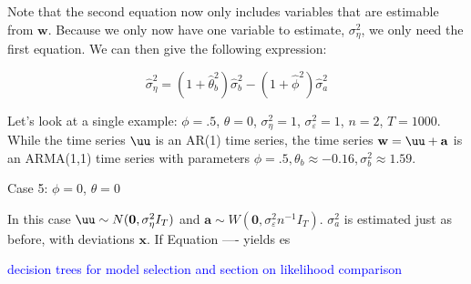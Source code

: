Note that the second equation now only includes variables that are estimable from $\mathbf{w}$. Because we only now have one variable to estimate, $\sigma_\eta^2$, we only need the first equation. We can then give the following expression:

\begin{equation}
    \label{var_eta_hat_no_theta}
    \hat{\sigma}_\eta^2 = (1 + \hat{\theta}_b^2)\hat{\sigma}_b^2 - (1 + \hat{\phi}^2)\hat{\sigma}_a^2 
\end{equation}



Let's look at a single example: $\phi = .5$, $\theta = 0$, $\sigma_\eta^2 = 1$, $\sigma_\varepsilon^2 = 1$, $n = 2$, $T = 1000$. While the time series $\uu$ is an AR(1) time series, the time series $\mathbf{w} = \uu + \mathbf{a}$ is an ARMA(1,1) time series with parameters $\phi = .5, \theta_b \approx-0.16, \sigma_b^2 \approx 1.59$. 

Case 5: $\phi = 0$, $\theta = 0$

In this case $\uu \sim N(\mathbf{0},\sigma_\eta^2I_T)$ and $\mathbf{a}\sim W(\mathbf{0}, \sigma_\varepsilon^2n^{-1}I_T)$. $\sigma_a^2$ is estimated just as before, with deviations $\mathbf{x}$. If Equation ---- yields es

\textcolor{blue}{decision trees for model selection and section on likelihood comparison}
